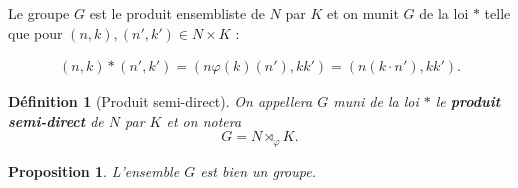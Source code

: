 \documentclass[french]{report}
\newtheorem{prop}{Proposition}[section]
\newtheorem{definition}{Définition}[section]
\begin{document}
Le groupe $G$ est le produit ensembliste de $N$ par $K$ et on munit $G$ de la loi $*$ telle que pour $(n,k),(n',k') \in N \times K$ :

\begin{gather*}
  (n,k) * (n',k') = (n \varphi(k)(n'), kk' ) = (n (k \cdot n'), kk').
\end{gather*}

\begin{definition}[Produit semi-direct]\label{def_semi_direct}
  On appellera $G$ muni de la loi $*$ le \textbf{produit semi-direct} de $N$ par $K$ et on notera
  $$ G = N \rtimes _{\varphi} K. $$
\end{definition}

\begin{prop}
  L'ensemble $G$ est bien un groupe.
\end{prop}
\end{document}
